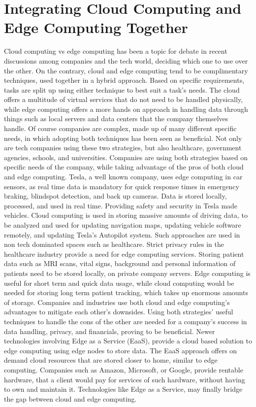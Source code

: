 \documentclass[conference]{IEEEtran}
\begin{document}
\section{Integrating Cloud Computing and Edge Computing Together}
Cloud computing vs edge computing has been a topic for debate in recent discussions among companies and the tech world, deciding which one to use over the other. On the contrary, cloud and edge computing tend to be complimentary techniques, used together in a hybrid approach. Based on specific requirements, tasks are split up using either technique to best suit a task's needs. The cloud offers a multitude of virtual services that do not need to be handled physically, while edge computing offers a more hands on approach in handling data through things such as local servers and data centers that the company themselves handle. Of course companies are complex, made up of many different specific needs, in which adopting both techniques has been seen as beneficial. Not only are tech companies using these two strategies, but also healthcare, government agencies, schools, and universities. 
Companies are using both strategies based on specific needs of the company, while taking advantage of the pros of both cloud and edge computing. Tesla, a well known company, uses edge computing in car sensors, as real time data is mandatory for quick response times in emergency braking, blindspot detection, and back up cameras. Data is stored locally, processed, and used in real time. Providing safety and security in Tesla made vehicles. Cloud computing is used in storing massive amounts of driving data, to be analyzed and used for updating navigation maps, updating vehicle software remotely, and updating Tesla’s Autopilot system. 
Such approaches are used in non tech dominated spaces such as healthcare. Strict privacy rules in the healthcare industry provide a need for edge computing services. Storing patient data such as MRI scans, vital signs, background and personal information of patients need to be stored locally, on private company servers. Edge computing is useful for short term and quick data usage, while cloud computing would be needed for storing long term patient tracking, which takes up enormous amounts of storage. 
Companies and industries use both cloud and edge computing’s advantages to mitigate each other's downsides. Using both strategies’ useful techniques to handle the cons of the other are needed for a company's success in data handling, privacy, and financials, proving to be beneficial. Newer technologies involving Edge as a Service (EaaS), provide a cloud based solution to edge computing using edge nodes to store data. The EaaS approach offers on demand cloud resources that are stored closer to home, similar to edge computing. Companies such as Amazon, Microsoft, or Google, provide rentable hardware, that a client would pay for services of such hardware, without having to own and maintain it. Technologies like Edge as a Service, may finally bridge the gap between cloud and edge computing.
\end{document}
